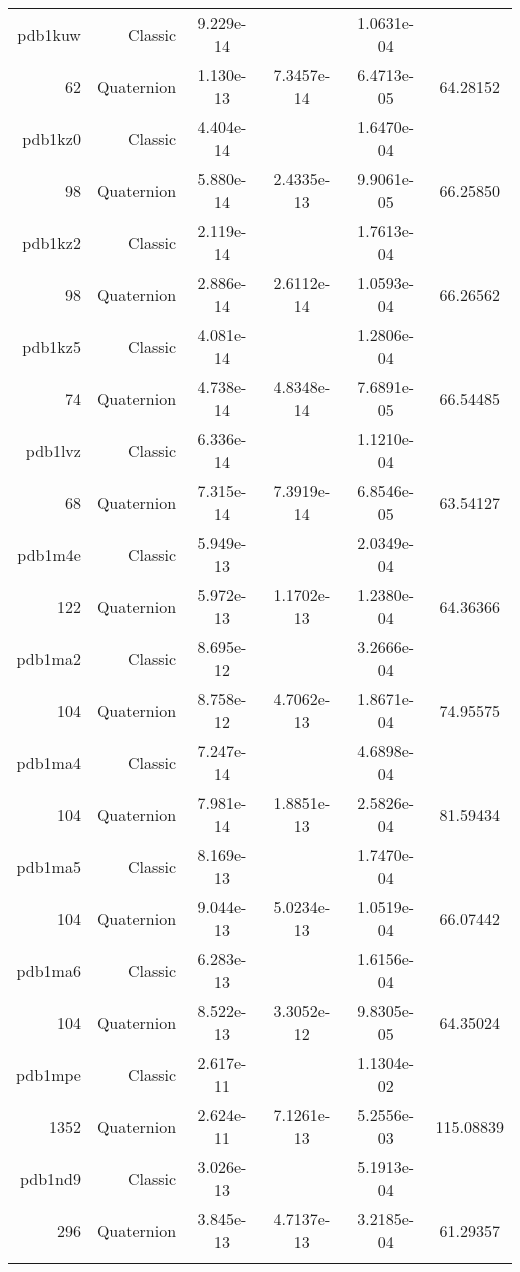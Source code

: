 \begin{xltabular}{\textwidth}{r|rS[table-format=1.3e+2]S[table-format=1.4e+2]S[table-format=1.4e+2]S[table-format=-1.5]}
pdb1kuw & Classic & 9.229e-14 &  & 1.0631e-04 & \\
62 & Quaternion & 1.130e-13 & 7.3457e-14 & 6.4713e-05 & 64.28152\\  \addlinespace
pdb1kz0 & Classic & 4.404e-14 &  & 1.6470e-04 & \\
98 & Quaternion & 5.880e-14 & 2.4335e-13 & 9.9061e-05 & 66.25850\\  \addlinespace
pdb1kz2 & Classic & 2.119e-14 &  & 1.7613e-04 & \\
98 & Quaternion & 2.886e-14 & 2.6112e-14 & 1.0593e-04 & 66.26562\\  \addlinespace
pdb1kz5 & Classic & 4.081e-14 &  & 1.2806e-04 & \\
74 & Quaternion & 4.738e-14 & 4.8348e-14 & 7.6891e-05 & 66.54485\\  \addlinespace
pdb1lvz & Classic & 6.336e-14 &  & 1.1210e-04 & \\
68 & Quaternion & 7.315e-14 & 7.3919e-14 & 6.8546e-05 & 63.54127\\  \addlinespace
pdb1m4e & Classic & 5.949e-13 &  & 2.0349e-04 & \\
122 & Quaternion & 5.972e-13 & 1.1702e-13 & 1.2380e-04 & 64.36366\\  \addlinespace
pdb1ma2 & Classic & 8.695e-12 &  & 3.2666e-04 & \\
104 & Quaternion & 8.758e-12 & 4.7062e-13 & 1.8671e-04 & 74.95575\\  \addlinespace
pdb1ma4 & Classic & 7.247e-14 &  & 4.6898e-04 & \\
104 & Quaternion & 7.981e-14 & 1.8851e-13 & 2.5826e-04 & 81.59434\\  \addlinespace
pdb1ma5 & Classic & 8.169e-13 &  & 1.7470e-04 & \\
104 & Quaternion & 9.044e-13 & 5.0234e-13 & 1.0519e-04 & 66.07442\\  \addlinespace
pdb1ma6 & Classic & 6.283e-13 &  & 1.6156e-04 & \\
104 & Quaternion & 8.522e-13 & 3.3052e-12 & 9.8305e-05 & 64.35024\\  \addlinespace
pdb1mpe & Classic & 2.617e-11 &  & 1.1304e-02 & \\
1352 & Quaternion & 2.624e-11 & 7.1261e-13 & 5.2556e-03 & 115.08839\\  \addlinespace
pdb1nd9 & Classic & 3.026e-13 &  & 5.1913e-04 & \\
296 & Quaternion & 3.845e-13 & 4.7137e-13 & 3.2185e-04 & 61.29357\\  \addlinespace

\end{xltabular}
